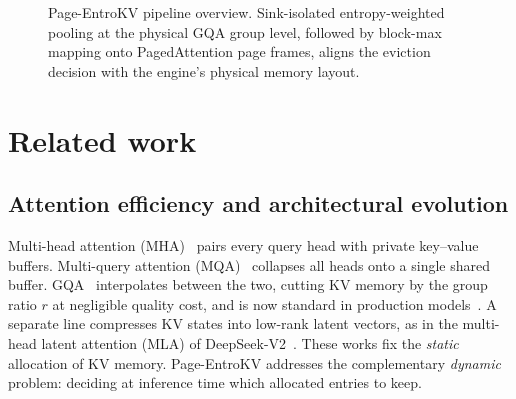 \documentclass[final,5p,times,twocolumn]{elsarticle}
\theoremstyle{definition}
\theoremstyle{remark}
\newcommand{\method}{Page-EntroKV}
\newcommand{\HQ}{H_{Q}}
\newcommand{\HKV}{H_{\mathrm{KV}}}
\newcommand{\Dhead}{D_{\mathrm{head}}}
\newcommand{\Nblk}{N_{\mathrm{blocks}}}
\newcommand{\Attn}[2]{\mathbf{A}_{#1,#2}}
\newcommand{\CollisionSink}[1]{\mathcal{H}^{\mathrm{sink}}_{2}\!\left(#1\right)}
\newcommand{\UOR}{\mathrm{UOR}}
\begin{document}
\begin{figure}[t]
\centering
{}
\caption{\method{} pipeline overview. Sink-isolated entropy-weighted
  pooling at the physical GQA group level, followed by block-max
  mapping onto PagedAttention page frames, aligns the eviction decision
  with the engine's physical memory layout.}
\label{fig:pipeline_overview}
\end{figure}

\section{Related work}
\label{sec:related}

\subsection{Attention efficiency and architectural evolution}
Multi-head attention (MHA)~\cite{vaswani2017attention} pairs every query
head with private key--value buffers. Multi-query attention
(MQA)~\cite{shazeer2019fast} collapses all heads onto a single shared
buffer. GQA~\cite{ainslie2023gqa} interpolates between the two, cutting
KV memory by the group ratio $r$ at negligible quality cost, and is now
standard in production
models~\cite{meta2024llama3,qwen2024qwen25,jiang2023mistral}. A separate
line compresses KV states into low-rank latent vectors, as in the
multi-head latent attention (MLA) of
DeepSeek-V2~\cite{deepseek2024deepseekv2}. These works fix the
\emph{static} allocation of KV memory. \method{} addresses the
complementary \emph{dynamic} problem: deciding at inference time which
allocated entries to keep.
\end{document}
